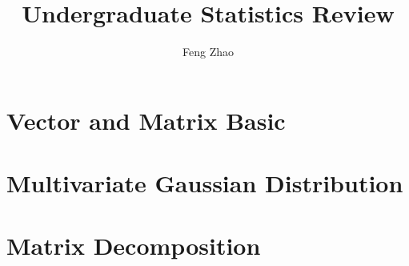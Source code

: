 \documentclass{book}
\title{Undergraduate Statistics Review}
\author{Feng Zhao}
\begin{document}
\maketitle
\chapter{Vector and Matrix Basic}

\chapter{Multivariate Gaussian Distribution}

\chapter{Matrix Decomposition}

\end{document}
